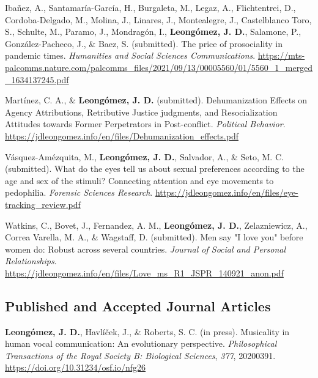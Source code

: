 \documentclass[11pt, a4paper]{awesome-cv}
\begin{document}
\hypertarget{refs_working_paper}{}
\leavevmode{}%
Ibañez, A., Santamaría-García, H., Burgaleta, M., Legaz, A.,
Flichtentrei, D., Cordoba-Delgado, M., Molina, J., Linares, J.,
Montealegre, J., Castelblanco Toro, S., Schulte, M., Paramo, J.,
Mondragón, I., \textbf{Leongómez, J. D.}, Salamone, P.,
González-Pacheco, J., \& Baez, S. (submitted). {The price of
prosociality in pandemic times}. \emph{Humanities and Social Sciences
Communications}.
\url{https://mts-palcomms.nature.com/palcomms_files/2021/09/13/00005560/01/5560_1_merged_1634137245.pdf}

\leavevmode{}%
Martínez, C. A., \& \textbf{Leongómez, J. D.} (submitted).
Dehumanization {Effects} on {Agency Attributions}, {Retributive Justice}
judgments, and {Resocialization Attitudes} towards {Former Perpetrators}
in {Post}-conflict. \emph{Political Behavior}.
\url{https://jdleongomez.info/en/files/Dehumanization_effects.pdf}

\leavevmode{}%
Vásquez-Amézquita, M., \textbf{Leongómez, J. D.}, Salvador, A., \& Seto,
M. C. (submitted). {What do the eyes tell us about sexual preferences
according to the age and sex of the stimuli? Connecting attention and
eye movements to pedophilia}. \emph{Forensic Sciences Research}.
\url{https://jdleongomez.info/en/files/eye-tracking_review.pdf}

\leavevmode{}%
Watkins, C., Bovet, J., Fernandez, A. M., \textbf{Leongómez, J. D.},
Zelazniewicz, A., Correa Varella, M. A., \& Wagstaff, D. (submitted).
{Men say "I love you" before women do: Robust across several countries}.
\emph{Journal of Social and Personal Relationships}.
\url{https://jdleongomez.info/en/files/Love_ms_R1_JSPR_140921_anon.pdf}

\endgroup

\hypertarget{section-2}{%
\subsection{\texorpdfstring{\textbf{Published and Accepted Journal Articles}}{}}\label{section-2}}

\begingroup
\setlength{\parindent}{-0.5in}
\setlength{\leftskip}{0.5in}

\hypertarget{refs_journals}{}
\leavevmode{}%
\textbf{Leongómez, J. D.}, Havlíček, J., \& Roberts, S. C. (in press).
Musicality in human vocal communication: {An} evolutionary perspective.
\emph{Philosophical Transactions of the Royal Society B: Biological
Sciences}, \emph{377}, 20200391.
\url{https://doi.org/10.31234/osf.io/nfg26}
\end{document}
